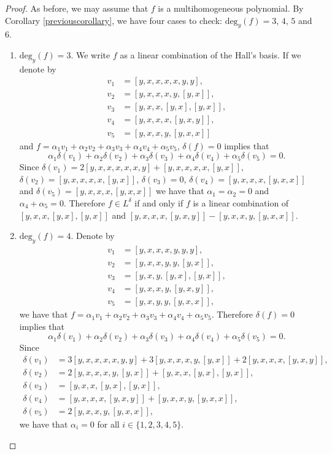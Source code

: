 \documentclass{cimart}
\begin{document}
\begin{proof} As before, we may assume that $f$ is a multihomogeneous
polynomial. By Corollary \ref{previouscorollary}, we have four cases to check: $\mbox{deg}_y(f) = 3$, $4$, $5$ and $6$. 
\begin{enumerate}
\item $\mbox{deg}_y(f) = 3$. We write $f$ as a linear combination of the Hall's basis.  If we denote by 
\begin{align*}
v_1 &= [y, x, x, x, x, y, y],\\
v_2 &= [y, x, x, x, y, [y, x]],\\
v_3 &= [y, x, x, [y,x], [y, x]],\\
v_4 &= [y, x, x, x, [y, x, y]],\\
v_5 &= [y, x, x, y, [y, x, x]]
\end{align*}
and $f = \alpha_1 v_1 + \alpha_2 v_2  + \alpha_3 v_3 + \alpha_4 v_4 + \alpha_5 v_5$, $\delta(f) = 0$ implies that 
$$\alpha_1 \delta(v_1) + \alpha_2 \delta (v_2)  + \alpha_3 \delta (v_3) + \alpha_4 \delta (v_4)+ \alpha_5 \delta (v_5) = 0.$$ 
Since $\delta(v_1)  = 2[y, x, x, x, x, x, y ]  +  [y, x, x, x, x, [y, x]]$, $\delta(v_2) = [y, x, x, x, x, [y, x]]$, $\delta(v_3) = 0$, $\delta(v_4) = [y, x, x, x, [y, x, x]]$ and $\delta(v_5) = [y, x, x, x, [y, x, x]]$ we have that $\alpha_1 = \alpha_2 = 0$ and $\alpha_4 + \alpha_5 = 0$. Therefore $f \in  L ^\delta$ if and only if $f$ is a linear combination of $[y, x, x, [y, x],[y, x]]$ and $[y, x, x, x, [y, x, y]] - [y, x, x, y, [y, x, x]]$.
 
\item $\mbox{deg}_y(f) = 4$.  Denote by 
\begin{align*}
v_1 &= [y, x, x, x, y, y, y],\\
v_2 &= [y, x, x, y, y, [y, x]],\\
v_3 &= [y, x, y, [y,x], [y, x]],\\
v_4 &= [y, x, x, y, [y, x, y]],\\
v_5 &= [y, x, y, y, [y, x, x]],
\end{align*}
we have that $f = \alpha_1 v_1 + \alpha_2 v_2  + \alpha_3 v_3 + \alpha_4 v_4 + \alpha_5 v_5$. Therefore $\delta(f) = 0$ implies that 
$$\alpha_1 \delta(v_1) + \alpha_2 \delta (v_2)  + \alpha_3 \delta (v_3) + \alpha_4 \delta (v_4)+ \alpha_5 \delta (v_5) = 0.$$ 
Since  
\begin{align*}
\delta(v_1)  &= 3 [y, x, x, x, x, y, y] + 3[y, x, x, x, y, [y, x]] + 2[y, x, x, x, [y, x, y]],\\
\delta(v_2) &= 2[y, x, x, x, y, [y, x]] + [y, x, x, [y, x], [y, x]],\\ \delta(v_3) &=  [y, x, x, [y, x], [y, x]],\\
\delta(v_4) &= [y, x, x, x, [y, x, y]] + [y, x, x, y, [y, x, x]],\\
\delta(v_5) &= 2[y, x, x, y, [y, x, x]],
\end{align*}
we have that $\alpha_i =  0$ for all $i \in \{1, 2, 3, 4, 5\}$.


\end{enumerate}
\end{proof}
\end{document}
